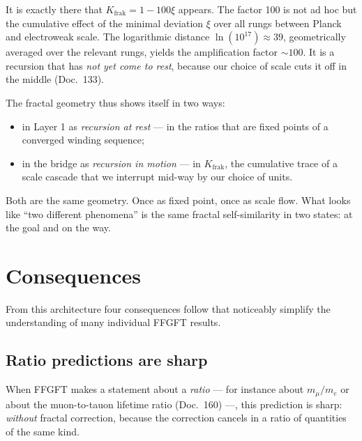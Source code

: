 It is exactly there that $K_{\mathrm{frak}} = 1 - 100\xi$ appears. The
factor 100 is not ad hoc but the cumulative effect of the minimal
deviation $\xi$ over all rungs between Planck and electroweak scale.
The logarithmic distance $\ln(10^{17}) \approx 39$, geometrically
averaged over the relevant rungs, yields the amplification factor
$\sim 100$. It is a recursion that has \emph{not yet come to rest},
because our choice of scale cuts it off in the middle (Doc.~133).

The fractal geometry thus shows itself in two ways:

\begin{itemize}\setlength\itemsep{2pt}
  \item in Layer 1 as \emph{recursion at rest} ---
        in the ratios that are fixed points of a converged
        winding sequence;
  \item in the bridge as \emph{recursion in motion} ---
        in $K_{\mathrm{frak}}$, the cumulative trace of a
        scale cascade that we interrupt mid-way by our choice
        of units.
\end{itemize}

\noindent
Both are the same geometry. Once as fixed point, once as scale flow.
What looks like ``two different phenomena'' is the same fractal
self-similarity in two states: at the goal and on the way.

\section{Consequences}

From this architecture four consequences follow that noticeably
simplify the understanding of many individual FFGFT results.

\subsection{Ratio predictions are sharp}

When FFGFT makes a statement about a \emph{ratio} --- for instance
about $m_{\mu}/m_{e}$ or about the muon-to-tauon lifetime ratio
(Doc.~160) ---, this prediction is sharp: \emph{without} fractal
correction, because the correction cancels in a ratio of quantities of
the same kind.

\begin{center}
\end{center}


